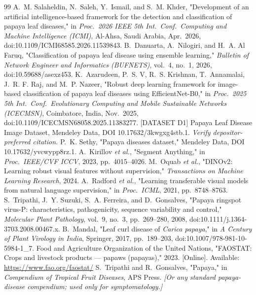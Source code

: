 \documentclass[10pt,twocolumn,a4paper]{article}
\begin{document}
{\begin{thebibliography}{99}
 A.~M. Salaheldin, N.~Saleh, Y.~Ismail, and S.~M. Khder, "Development of an artificial intelligence-based framework for the detection and classification of papaya leaf diseases," in \emph{Proc.\ 2026 IEEE 5th Int.\ Conf.\ Computing and Machine Intelligence (ICMI)}, Al-Ahsa, Saudi Arabia, Apr.\ 2026, doi:10.1109/ICMI68585.2026.11539843.
 B.~Danuarta, A.~Nilogiri, and H.~A. Al Faruq, "Classification of papaya leaf disease using ensemble learning," \emph{Bulletin of Network Engineer and Informatics (BUFNETS)}, vol.~4, no.~1, 2026, doi:10.59688/asexz453.
 K.~Azarudeen, P.~S. V, R.~S. Krishnan, T.~Annamalai, J.~R. F. Raj, and M.~P. Nazeer, "Robust deep learning framework for image-based classification of papaya leaf diseases using EfficientNet-B0," in \emph{Proc.\ 2025 5th Int.\ Conf.\ Evolutionary Computing and Mobile Sustainable Networks (ICECMSN)}, Coimbatore, India, Nov.\ 2025, doi:10.1109/ICECMSN68058.2025.11383277.
 [DATASET D1] Papaya Leaf Disease Image Dataset, Mendeley Data, DOI 10.17632/3kwgxg4stb.1. \emph{Verify depositor-preferred citation.}
 P.~K. Sethy, "Papaya diseases dataset," Mendeley Data, DOI 10.17632/yvcwypp8rz.1.
 A.~Kirillov \emph{et al.}, "Segment Anything," in \emph{Proc.\ IEEE/CVF ICCV}, 2023, pp.~4015--4026.
 M.~Oquab \emph{et al.}, "DINOv2: Learning robust visual features without supervision," \emph{Transactions on Machine Learning Research}, 2024.
 A.~Radford \emph{et al.}, "Learning transferable visual models from natural language supervision," in \emph{Proc.\ ICML}, 2021, pp.~8748--8763.
 S.~Tripathi, J.~Y. Suzuki, S.~A. Ferreira, and D.~Gonsalves, "Papaya ringspot virus-P: characteristics, pathogenicity, sequence variability and control," \emph{Molecular Plant Pathology}, vol.~9, no.~3, pp.~269--280, 2008, doi:10.1111/j.1364-3703.2008.00467.x.
 B.~Mandal, "Leaf curl disease of \emph{Carica papaya}," in \emph{A Century of Plant Virology in India}, Springer, 2017, pp.~189--203, doi:10.1007/978-981-10-5984-1\_7.
 Food and Agriculture Organization of the United Nations, "FAOSTAT: Crops and livestock products --- papaws (papayas)," 2023. [Online]. Available: \url{https://www.fao.org/faostat/}
 S.~Tripathi and R.~Gonsalves, "Papaya," in \emph{Compendium of Tropical Fruit Diseases}, APS Press. \emph{[Or any standard papaya-disease compendium; used only for symptomatology.]}

\end{thebibliography}}
\end{document}
